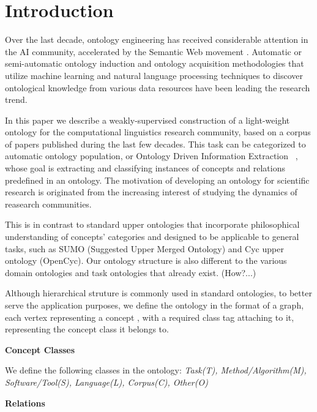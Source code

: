 \section{Introduction}

Over the last decade, ontology engineering has received considerable attention
in the AI community, accelerated by the Semantic Web movement \cite{}. Automatic or
semi-automatic ontology induction and ontology acquisition methodologies that
utilize machine learning and natural language processing techniques to discover
ontological knowledge from various data resources have been leading the research
trend.

In this paper we describe a weakly-supervised construction of a light-weight ontology for the
computational linguistics research community, based on a corpus of papers published
during the last few decades. This task can be categorized to automatic ontology population, 
or Ontology Driven Information Extraction ~\cite{Bontcheva_Cunningham_2003}, 
whose goal is extracting and classifying instances of concepts and relations predefined in an ontology.
The motivation of developing an ontology for scientific research is originated
from the increasing interest of studying the dynamics of reasearch communities. 

This is in contrast to standard upper ontologies that incorporate philosophical
understanding of concepts' categories  and designed to be applicable to general tasks,
 such as SUMO (Suggested Upper Merged Ontology) and Cyc upper ontology
(OpenCyc). 
Our ontology structure is also different to the various domain
 ontologies and task ontologies that already exist. (How?...)

Although hierarchical struture is commonly used in standard ontologies, to better serve the application purposes,  we
define the ontology in the format of a graph, each vertex representing a concept
, with a required class tag attaching to it, representing the
concept class it belongs to. 

\textbf{Concept Classes}

We define the following classes in the ontology:
\emph{Task(T), Method/Algorithm(M), Software/Tool(S),
Language(L), Corpus(C), Other(O)}

\textbf{Relations} 

